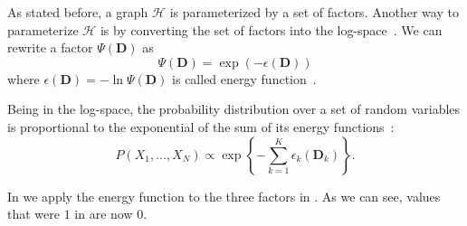 \bigskip

As stated before, a graph $\mathcal{H}$ is parameterized by a set of \glspl{factor}.
Another way to parameterize $\mathcal{H}$ is by converting the set of \glspl{factor} into the log-space~\citep{koller2009probabilistic}.
We can rewrite a factor $\Psi(\mathbf{D})$ as
\begin{equation*}
  \label{equ:energy-function}
  \Psi(\mathbf{D}) = \exp(-\epsilon(\mathbf{D}))
\end{equation*}
where $\epsilon(\mathbf{D})=-\ln\Psi(\mathbf{D})$ is called \gls{energy function}~\citep{koller2009probabilistic}.

Being in the log-space, the \gls{probability distribution} over a set of \glspl{random variable} is proportional to the exponential of the sum of its energy functions~\citep{koller2009probabilistic}:
\begin{equation}
  \label{equ:p-energy-function}
  P\left(X_1,\dots,X_N\right) \propto \exp\left\{-\sum_{k=1}^K\epsilon_k\left(\mathbf{D}_k\right)\right\}.
\end{equation}

In  we apply the \gls{energy function} to the three factors in .
As we can see, values that were $1$ in  are now $0$.

